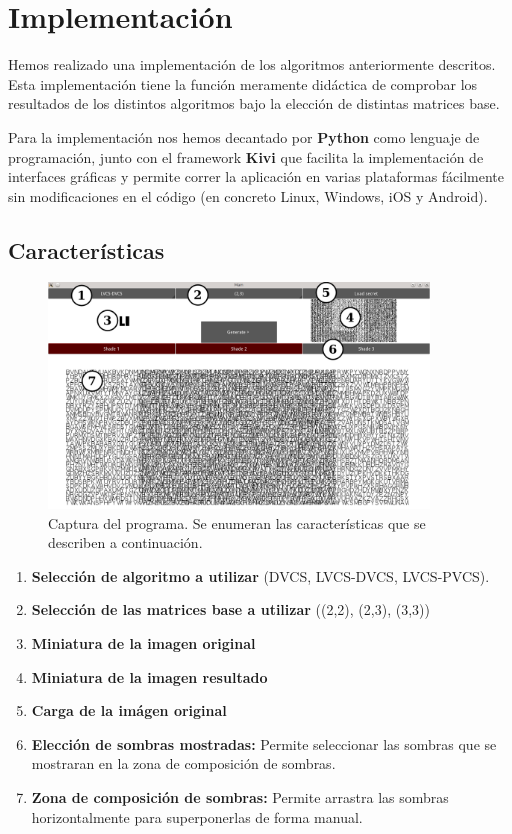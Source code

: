 \section{Implementación}
Hemos realizado una implementación de los algoritmos anteriormente descritos.
Esta implementación tiene la función meramente didáctica de comprobar los
resultados de los distintos algoritmos bajo la elección de distintas matrices
base.

Para la implementación nos hemos decantado por \textbf{Python} como lenguaje de
programación, junto con el framework \textbf{Kivi} que facilita la
implementación de interfaces gráficas y permite correr la aplicación en varias
plataformas fácilmente sin modificaciones en el código (en concreto Linux,
Windows, iOS y Android).

\newpage
\subsection{Características}
\begin{figure}[h]
	\centering
	\includegraphics[width=0.9\textwidth]{images/programa}
	\caption{Captura del programa. Se enumeran las características que se
	describen a continuación.}
	\label{fig:programa}
\end{figure}

\begin{enumerate}
	\item \textbf{Selección de algoritmo a utilizar} (DVCS, LVCS-DVCS,
		LVCS-PVCS).
	\item \textbf{Selección de las matrices base a utilizar} ((2,2), (2,3),
		(3,3))
	\item \textbf{Miniatura de la imagen original}
	\item \textbf{Miniatura de la imagen resultado}
	\item \textbf{Carga de la imágen original}
	\item \textbf{Elección de sombras mostradas:} Permite seleccionar las
		sombras que se mostraran en la zona de composición de sombras.
	\item \textbf{Zona de composición de sombras:} Permite arrastra las
		sombras horizontalmente para superponerlas de forma manual.
\end{enumerate}

